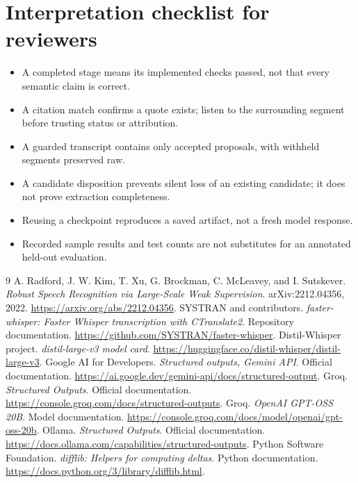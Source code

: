 \documentclass[11pt,a4paper]{article}
\begin{document}
\section{Interpretation checklist for reviewers}
\begin{itemize}
\item A completed stage means its implemented checks passed, not that every semantic claim is correct.
\item A citation match confirms a quote exists; listen to the surrounding segment before trusting status or attribution.
\item A guarded transcript contains only accepted proposals, with withheld segments preserved raw.
\item A candidate disposition prevents silent loss of an existing candidate; it does not prove extraction completeness.
\item Reusing a checkpoint reproduces a saved artifact, not a fresh model response.
\item Recorded sample results and test counts are not substitutes for an annotated held-out evaluation.
\end{itemize}

\clearpage
{}
\begin{thebibliography}{9}
 A. Radford, J. W. Kim, T. Xu, G. Brockman, C. McLeavey, and I. Sutskever. \emph{Robust Speech Recognition via Large-Scale Weak Supervision}. arXiv:2212.04356, 2022. \url{https://arxiv.org/abs/2212.04356}.
 SYSTRAN and contributors. \emph{faster-whisper: Faster Whisper transcription with CTranslate2}. Repository documentation. \url{https://github.com/SYSTRAN/faster-whisper}.
 Distil-Whisper project. \emph{distil-large-v3 model card}. \url{https://huggingface.co/distil-whisper/distil-large-v3}.
 Google AI for Developers. \emph{Structured outputs, Gemini API}. Official documentation. \url{https://ai.google.dev/gemini-api/docs/structured-output}.
 Groq. \emph{Structured Outputs}. Official documentation. \url{https://console.groq.com/docs/structured-outputs}.
 Groq. \emph{OpenAI GPT-OSS 20B}. Model documentation. \url{https://console.groq.com/docs/model/openai/gpt-oss-20b}.
 Ollama. \emph{Structured Outputs}. Official documentation. \url{https://docs.ollama.com/capabilities/structured-outputs}.
 Python Software Foundation. \emph{difflib: Helpers for computing deltas}. Python documentation. \url{https://docs.python.org/3/library/difflib.html}.
\end{thebibliography}
\end{document}
